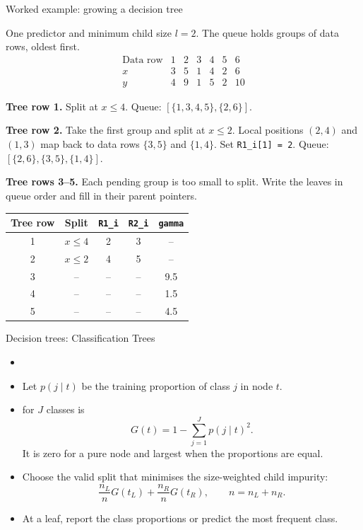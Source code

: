 \documentclass[10pt]{beamer}
\begin{document}
\begin{frame}{Worked example: growing a decision tree}
\small
\setlength{\parskip}{1mm}

One predictor and minimum child size $l=2$. The queue holds groups of data rows, oldest first.
\[
\begin{array}{c|rrrrrr}
\text{Data row} & 1 & 2 & 3 & 4 & 5 & 6\\
x & 3 & 5 & 1 & 4 & 2 & 6\\
y & 4 & 9 & 1 & 5 & 2 & 10
\end{array}
\]

\textbf{Tree row 1.} Split at $x\leq4$. Queue: $[\{1,3,4,5\},\{2,6\}]$.

\pause
\textbf{Tree row 2.} Take the first group and split at $x\leq2$. Local positions
$(2,4)$ and $(1,3)$ map back to data rows $\{3,5\}$ and $\{1,4\}$.
Set \texttt{R1\_i[1] = 2}. Queue: $[\{2,6\},\{3,5\},\{1,4\}]$.

\pause
\textbf{Tree rows 3--5.} Each pending group is too small to split. Write the leaves in queue order and fill in their parent pointers.

{\centering
\begin{tabular}{c|c|cc|c}
Tree row & Split & \texttt{R1\_i} & \texttt{R2\_i} & \texttt{gamma}\\ \hline
1 & $x\leq4$ & 2 & 3 & --\\
2 & $x\leq2$ & 4 & 5 & --\\
3 & -- & -- & -- & 9.5\\
4 & -- & -- & -- & 1.5\\
5 & -- & -- & -- & 4.5
\end{tabular}\par}
\end{frame}

\begin{frame}{Decision trees: Classification Trees}
\begin{itemize}
\item {}\pause
\item Let $p(j\mid t)$ be the training proportion of class $j$ in node $t$.
\item {} for $J$ classes is
\[
G(t)=1-\sum_{j=1}^J p(j\mid t)^2.
\]
It is zero for a pure node and largest when the proportions are equal.
\pause
\item Choose the valid split that minimises the size-weighted child impurity:
\[
\frac{n_L}{n}G(t_L)+\frac{n_R}{n}G(t_R),
\qquad n=n_L+n_R.
\]
\pause
\item At a leaf, report the class proportions or predict the most frequent class.
\end{itemize}
\end{frame}
\end{document}

